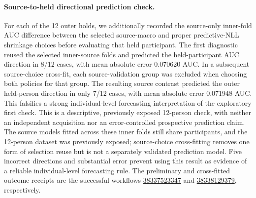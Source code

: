 \paragraph{Source-to-held directional prediction check.}
For each of the 12 outer holds, we additionally recorded the
source-only inner-fold AUC difference between the selected
source-macro and proper predictive-NLL shrinkage choices
before evaluating that held participant. The first diagnostic reused the selected inner-source
folds and predicted the held-participant AUC direction
in 8/12 cases, with mean absolute error 0.070620 AUC.
In a subsequent source-choice cross-fit, each source-validation
group was excluded when choosing both policies for that group.
The resulting source contrast predicted the outer held-person
direction in only 7/12 cases, with mean absolute error
0.071948 AUC. This falsifies a strong individual-level
forecasting interpretation of the exploratory first check. This is a descriptive, previously exposed
12-person check, with neither an independent acquisition nor
an error-controlled prospective prediction claim. The source
models fitted across these inner folds still share participants,
and the 12-person dataset was previously exposed; source-choice
cross-fitting removes one form of selection reuse but is not a
separately validated prediction model. Five
incorrect directions and substantial error prevent using this
result as evidence of a reliable individual-level forecasting
rule. The preliminary and cross-fitted outcome receipts are the
successful workflows
\href{https://github.com/lindicaphxag-tech/kaggle/actions/runs/38337523347}{38337523347}
and
\href{https://github.com/lindicaphxag-tech/kaggle/actions/runs/38338129379}{38338129379},
respectively.
